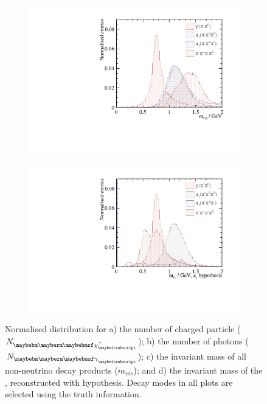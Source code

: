 \begin{figure}[htbp]
\begin{subfigure}[b]{0.45\textwidth}
  \caption{}
  \label{fig:tauVarNPhoton}
\end{subfigure}
\begin{subfigure}[b]{0.45\textwidth}
 \includegraphics[width=\textwidth]{tau/var2/mVis_100GeV_improved_zoom.pdf}
  \caption{}
  \label{fig:tauVarMVis}
\end{subfigure}
\begin{subfigure}[b]{0.45\textwidth}
 \includegraphics[width=\textwidth]{tau/var2/mA1A1Fit_100GeV_improved_zoom.pdf}
  \caption{}
  \label{fig:tauVarMA1}
\end{subfigure}

\caption
{Normalised distribution for a) the number of charged particle (${N}_{\charge}$); b) the number of photons (${N}_{\Pgg}$); c) the invariant mass of all non-neutrino decay products ($m_{vis}$); and d) the invariant mass of the \Pai, reconstructed with \decayAiPhotonShort hypothesis. Decay modes in all plots are selected using the truth information.}
\label{fig:tauVar}
\end{figure}

